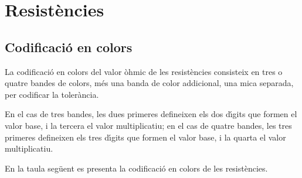 \chapter{Resist\`{e}ncies}

\section{Codificaci\'{o} en colors} 

La codificaci\'{o} en colors del valor \`{o}hmic de les resist\`{e}ncies
consisteix en tres o quatre bandes de colors, m\'{e}s una banda de color
addicional, una mica separada, per codificar la toler\`{a}ncia.

En el cas de tres bandes, les dues primeres defineixen els dos d\'{\i}gits que formen el valor
base, i la tercera el valor  multiplicatiu; en el cas de quatre bandes, les tres primeres
defineixen els tres d\'{\i}gits que formen el valor base, i la quarta el valor multiplicatiu.

En la taula seg\"{u}ent es presenta la codificaci\'{o} en colors de les resist\`{e}ncies.

